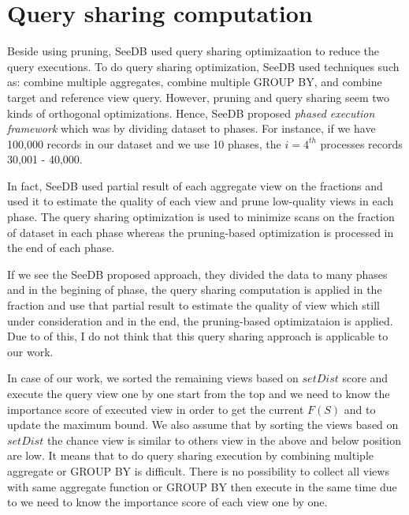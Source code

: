 \documentclass{article}
\begin{document}
%
%		



%		

\section{Query sharing computation}

Beside using pruning, SeeDB used query sharing optimizaation to reduce the query executions. To do query sharing optimization, SeeDB used techniques such as: combine multiple aggregates, combine multiple GROUP BY, and combine target and reference view query. However, pruning and query sharing seem two kinds of orthogonal optimizations. Hence, SeeDB proposed \textit{phased execution framework} which was by dividing dataset to phases. For instance, if we have 100,000 records in our dataset and we use 10 phases, the $i = 4^{th}$ processes records 30,001 - 40,000. 

In fact, SeeDB used partial result of each aggregate view on the fractions and used it to estimate the quality of each view and prune low-quality views in each phase. The query sharing optimization is used to minimize scans on the fraction of dataset in each phase whereas the pruning-based optimization is processed in the end of each phase.

If we see the SeeDB proposed approach, they divided the data to many phases and in the begining of phase, the query sharing computation is applied in the fraction and use that partial result to estimate the quality of view which still under consideration and in the end, the pruning-based optimizataion is applied. Due to of this, I do not think that this query sharing approach is applicable to our work. 

In case of our work, we sorted the remaining views based on $setDist$ score and execute the query view one by one start from the top and we need to know the importance score of executed view in order to get the current $ F(S) $ and to update the maximum bound. We also assume that by sorting the views based on $setDist$ the chance view is similar to others view in the above and below position are low. It means that to do query sharing execution by combining multiple aggregate or GROUP BY is difficult. There is no possibility to collect all views with same aggregate function or GROUP BY then execute in the same time due to we need to know the importance score of each view one by one.     
\end{document}
